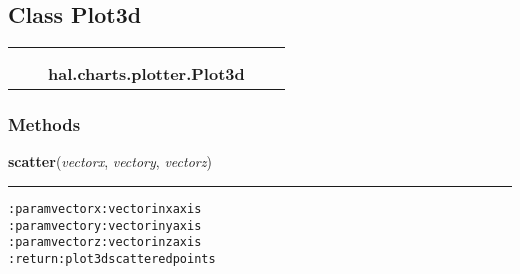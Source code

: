 

\subsection{Class Plot3d}

    \label{hal:charts:plotter:Plot3d}
\begin{tabular}{cccccc}
\multicolumn{2}{r}{\settowidth{\BCL}{object}\multirow{2}{\BCL}{object}}
&&
  \\\cline{3-3}
  &&\multicolumn{1}{c|}{}
&&
  \\
&&\multicolumn{2}{l}{\textbf{hal.charts.plotter.Plot3d}}
\end{tabular}



  \subsubsection{Methods}

    \label{hal:charts:plotter:Plot3d:scatter}

    \vspace{0.5ex}

\hspace{.8\funcindent}\begin{boxedminipage}{\funcwidth}

    \raggedright \textbf{scatter}(\textit{vectorx}, \textit{vectory}, \textit{vectorz})

    \vspace{-1.5ex}

    \rule{\textwidth}{0.5\fboxrule}
\setlength{\parskip}{2ex}
\begin{alltt}

:param vectorx: vector in x axis
:param vectory: vector in y axis
:param vectorz: vector in z axis
:return: plot 3d scattered points
\end{alltt}

\setlength{\parskip}{1ex}
    \end{boxedminipage}

